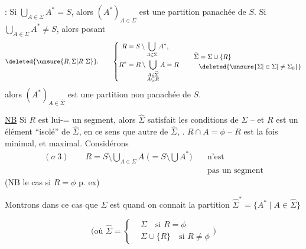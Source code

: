 \uline{}: Si $\bigcup_{A\in\Sigma}A^*=S$, alors  $(A^*)_{A\in\Sigma}$ est une partition   panachée de $S$. Si $\bigcup_{A\in\Sigma}A^*\ne S$, alors posant
\[
 \deleted{\unsure{R,\Sigma|R\ \Sigma}}\mathpunct{.}\qquad
 \left\{\begin{aligned}
 R&=S\setminus\bigcup_{A\in\Sigma}A^*,\\
 R^*&=R\setminus\bigcup_{\substack{A\in\widehat\Sigma\\ A\subsetneq R}}A=R
 \end{aligned}\right.\qquad
 \begin{aligned}
 \widehat\Sigma&=\Sigma\cup\{R\}\\
 &\deleted{\unsure{\Sigma|\in\Sigma|\ne\Sigma_0}}
 \end{aligned}
\]
alors $(A^*)_{A\in\widehat\Sigma}$ est une partition non panachée de $S$.

\uline{NB} Si $R$ est lui-= un segment, alors  $\widehat\Sigma$ satisfait les conditions de $\Sigma$ -- et $R$ est un élément  ``isolé'' de $\widehat\Sigma$, en ce sens que   autre   de $\widehat\Sigma$, . $R\cap A=\phi$ --   $R$ est  la fois minimal, et maximal. Considérons
\[
 \begin{aligned}
 (\sigma\ 3)\qquad R=S\setminus\bigcup_{A\in\Sigma}A\;
 \bigl(=S\setminus\bigcup A^*\bigr)&\quad\text{n'est}\\
 &\quad\text{pas un segment}
 \end{aligned}
\]
(NB  le cas si $R=\phi$ p. ex)

Montrons dans ce cas que  $\Sigma$ est   quand on connait la partition $\widehat\Sigma^*=\{A^*\mid A\in\widehat\Sigma\}$

\[
 \bigl(\text{où }\widehat\Sigma=\left\{\begin{aligned}
 &\Sigma\quad\text{si }R=\phi\\
 &\Sigma\cup\{R\}\quad\text{si }R\ne\phi
 \end{aligned}\right.\bigr)
\]
